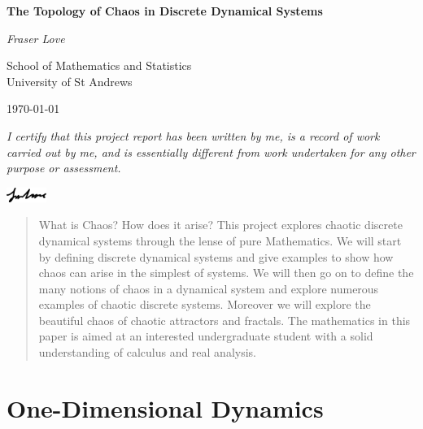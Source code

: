 \documentclass[11pt,a4paper,oneside]{memoir}
\theoremstyle{plain}
\theoremstyle{definition}
\begin{document}
\begin{titlingpage}
    \centering
        \vspace*{3cm}
 
        \Huge
        \textbf{The Topology of Chaos in Discrete Dynamical Systems}
             
        \vspace{1.5cm}
        
        \LARGE
        \textit{Fraser Love}
             
        \vspace{1.5cm}
             
        \Large
        School of Mathematics and Statistics\\
        University of St Andrews\\

        \vfill

        {\large \today\par}
 \end{titlingpage}

\noindent\textit{I certify that this project report has been written by me, is a record of work carried out by me, and is essentially different from work undertaken for any other purpose or assessment.}

\vspace{0cm}\hspace{12.8cm}\includegraphics[width=1.3cm]{signature}

\begin{abstract}
    \noindent What is Chaos? How does it arise? This project explores chaotic discrete dynamical systems through the lense of pure Mathematics. We will start by defining discrete dynamical systems and give examples to show how chaos can arise in the simplest of systems. We will then go on to define the many notions of chaos in a dynamical system and explore numerous examples of chaotic discrete systems. Moreover we will explore the beautiful chaos of chaotic attractors and fractals. The mathematics in this paper is aimed at an interested undergraduate student with a solid understanding of calculus and real analysis.
\end{abstract}

\tableofcontents

\chapter{One-Dimensional Dynamics}
\end{document}
